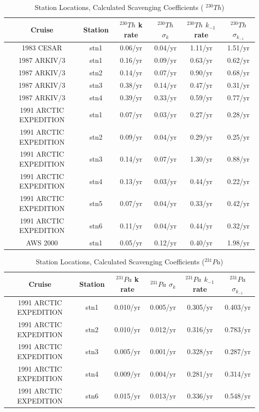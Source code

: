 \documentclass[paper=a4, fontsize=11pt]{scrartcl} %
\numberwithin{equation}{section} %
\numberwithin{figure}{section} %
\numberwithin{table}{section} %
\begin{document}
\begin{table}[h!]
\caption{Station Locations, Calculated Scavenging Coefficients ( $^{230}Th$)}%
\centering
\begin{tabular}{ |c|c|c|c|c|c|}
\hline
 Cruise &Station&$^{230}Th$ k rate&$^{230}Th$ $\sigma_{k}$&$^{230}Th$ $k_{-1}$ rate&$^{230}Th$ $\sigma_{k_{-1}}$\\
\hline
1983 CESAR &stn1&0.06/yr&0.04/yr&1.11/yr&1.51/yr\\
1987 ARKIV/3&stn1&0.16/yr&0.09/yr&0.63/yr&0.62/yr\\
1987 ARKIV/3&stn2&0.14/yr&0.07/yr&0.90/yr&0.68/yr\\
1987 ARKIV/3&stn3&0.38/yr&0.14/yr&0.47/yr&0.31/yr\\
1987 ARKIV/3&stn4&0.39/yr&0.33/yr&0.59/yr&0.77/yr\\
1991 ARCTIC EXPEDITION&stn1&0.07/yr&0.03/yr&0.27/yr&0.28/yr\\
1991 ARCTIC EXPEDITION&stn2&0.09/yr&0.04/yr&0.29/yr&0.25/yr\\
1991 ARCTIC EXPEDITION&stn3&0.14/yr&0.07/yr&1.30/yr&0.88/yr\\
1991 ARCTIC EXPEDITION&stn4&0.13/yr&0.03/yr&0.44/yr&0.22/yr\\
1991 ARCTIC EXPEDITION&stn5&0.07/yr&0.04/yr&0.33/yr&0.42/yr\\
1991 ARCTIC EXPEDITION&stn6&0.11/yr&0.04/yr&0.44/yr&0.32/yr\\
AWS 2000&stn1              &0.05/yr&0.12/yr\footnotemark[4]&0.40/yr&1.98/yr\footnotemark[4]\\
\hline
\end{tabular}
\label{tab:kkth}
\end{table}

\begin{table}[h!]
\caption{Station Locations, Calculated Scavenging Coefficients ($^{231}Pa$)}%
\centering
\begin{tabular}{ |c|c|c|c|c|c|}
\hline
 Cruise &Station&$^{231}Pa$ k rate& $^{231}Pa$ $\sigma_{k}$&$^{231}Pa$ $k_{-1}$ rate&$^{231}Pa$ $\sigma_{k_{-1}}$\\
\hline

1991 ARCTIC EXPEDITION&stn1&0.010/yr&0.005/yr&0.305/yr&0.403/yr\\
1991 ARCTIC EXPEDITION&stn2&0.010/yr&0.012/yr&0.316/yr&0.783/yr\\
1991 ARCTIC EXPEDITION&stn3&0.005/yr&0.001/yr&0.328/yr&0.287/yr\\
1991 ARCTIC EXPEDITION&stn4&0.009/yr&0.004/yr&0.281/yr&0.314/yr\\
1991 ARCTIC EXPEDITION&stn6&0.015/yr&0.013/yr&0.336/yr&0.548/yr\\
\hline
\end{tabular}
\label{tab:kkpa}
\end{table}
\end{document}
